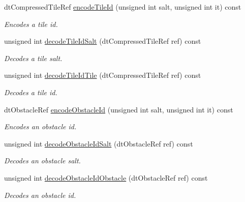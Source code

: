 \begin{DoxyCompactItemize}
\item 
\mbox{\label{classdtTileCache_a8e894bf86dc38b622fac1afe3ba5fe84}} 
dt\+Compressed\+Tile\+Ref \hyperlink{classdtTileCache_a8e894bf86dc38b622fac1afe3ba5fe84}{encode\+Tile\+Id} (unsigned int salt, unsigned int it) const
\begin{DoxyCompactList}\small\item\em Encodes a tile id. \end{DoxyCompactList}\item 
\mbox{\label{classdtTileCache_a30b610f38d3f6a73065fad5438c31ec7}} 
unsigned int \hyperlink{classdtTileCache_a30b610f38d3f6a73065fad5438c31ec7}{decode\+Tile\+Id\+Salt} (dt\+Compressed\+Tile\+Ref ref) const
\begin{DoxyCompactList}\small\item\em Decodes a tile salt. \end{DoxyCompactList}\item 
\mbox{\label{classdtTileCache_a9a64eecd18a74bb994d076dced0ec0be}} 
unsigned int \hyperlink{classdtTileCache_a9a64eecd18a74bb994d076dced0ec0be}{decode\+Tile\+Id\+Tile} (dt\+Compressed\+Tile\+Ref ref) const
\begin{DoxyCompactList}\small\item\em Decodes a tile id. \end{DoxyCompactList}\item 
\mbox{\label{classdtTileCache_a0d0ae89585f257f5ff0961e9eabfb52d}} 
dt\+Obstacle\+Ref \hyperlink{classdtTileCache_a0d0ae89585f257f5ff0961e9eabfb52d}{encode\+Obstacle\+Id} (unsigned int salt, unsigned int it) const
\begin{DoxyCompactList}\small\item\em Encodes an obstacle id. \end{DoxyCompactList}\item 
\mbox{\label{classdtTileCache_ad2ba8e2882fca7ffb2b9239879cac3c7}} 
unsigned int \hyperlink{classdtTileCache_ad2ba8e2882fca7ffb2b9239879cac3c7}{decode\+Obstacle\+Id\+Salt} (dt\+Obstacle\+Ref ref) const
\begin{DoxyCompactList}\small\item\em Decodes an obstacle salt. \end{DoxyCompactList}\item 
\mbox{\label{classdtTileCache_a4351916cf85bcc4d3fc2bd477b0f373f}} 
unsigned int \hyperlink{classdtTileCache_a4351916cf85bcc4d3fc2bd477b0f373f}{decode\+Obstacle\+Id\+Obstacle} (dt\+Obstacle\+Ref ref) const
\begin{DoxyCompactList}\small\item\em Decodes an obstacle id. \end{DoxyCompactList}\end{DoxyCompactItemize}


